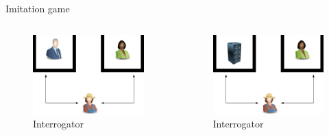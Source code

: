 \begin{frame}{Imitation game}
		\begin{columns}
			\begin{column}{.5\textwidth}
				\begin{figure}
					\includegraphics[width=.75\textwidth, center]{figures/imitation_game_1}
					\caption*{Interrogator}
				\end{figure}
			\end{column}
			\begin{column}{.5\textwidth}
				\begin{figure}
					\includegraphics[width=.75\textwidth, center]{figures/imitation_game_2}
					\caption*{Interrogator}
				\end{figure}				
			\end{column}
		\end{columns}
\end{frame}


